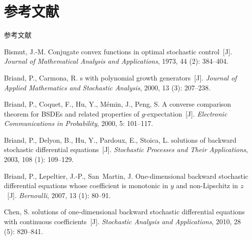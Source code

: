 \documentclass[xcolor=svgnames,serif,table,10pt]{beamer}
\begin{document}
\section*{参考文献}

\begin{frame}[allowframebreaks]{参考文献}
\tiny
\sffamily
\begin{thebibliography}{57}

Bismut, J.-M.
\newblock Conjugate convex functions in optimal stochastic control~[J].
\newblock \emph{Journal of Mathematical Analysis and Applications}, 1973,
  44 (2): 384--404.

Briand, P., Carmona, R.
s with polynomial growth generators~[J].
\newblock \emph{Journal of Applied Mathematics and Stochastic Analysis}, 2000,
  13 (3): 207--238.

Briand, P., Coquet, F., Hu, Y., M\'{e}min, J., Peng, S.
\newblock A converse comparison theorem for {BSDE}s and related properties of
  $g$-expectation~[J].
\newblock \emph{Electronic Communications in Probability}, 2000, 5:
  101--117.

Briand, P., Delyon, B., Hu, Y., Pardoux, E., Stoica, L.
 solutions of backward stochastic differential equations~[J].
\newblock \emph{Stochastic Processes and Their Applications}, 2003,
  108 (1): 109--129.

Briand, P., Lepeltier, J.-P., San~Martin, J.
\newblock One-dimensional backward stochastic differential equations whose
  coefficient is monotonic in $y$ and non-{L}ipschitz in $z$~[J].
\newblock \emph{Bernoulli}, 2007, 13 (1): 80--91.

Chen, S.
 solutions of one-dimensional backward stochastic differential
  equations with continuous coefficients~[J].
\newblock \emph{Stochastic Analysis and Applications}, 2010, 28
  (5): 820--841.


\end{thebibliography}
\end{frame}
\end{document}
